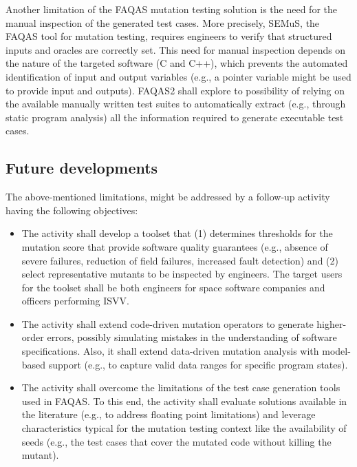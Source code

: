 Another limitation of the FAQAS mutation testing solution is the need for the manual inspection of the generated test cases. More precisely, SEMuS, the FAQAS tool for mutation testing, requires engineers to verify that structured inputs and oracles are correctly set. This need for manual inspection depends on the nature of the targeted software (C and C++), which prevents the automated identification of input and output variables (e.g., a pointer variable might be used to provide input and outputs). FAQAS2 shall explore to possibility of relying on the available manually written test suites to automatically extract (e.g., through static program analysis) all the information required to generate executable test cases.

\subsection{Future developments}

The above-mentioned limitations, might be addressed by a follow-up activity having the following objectives:

\begin{itemize}
\item {}
The activity shall develop a toolset that (1) determines thresholds for the mutation score that provide software quality guarantees (e.g., absence of severe failures, reduction of field failures, increased fault detection) and (2) select representative mutants to be inspected by engineers. The target users for the toolset shall be both engineers for space software companies and officers performing ISVV.

\item {} The activity shall extend code-driven mutation operators to generate higher-order errors, possibly simulating mistakes in the understanding of software specifications. Also, it shall extend data-driven mutation analysis with model-based support (e.g., to capture valid data ranges for specific program states).

\item {} The activity shall overcome the limitations of the test case generation tools used in FAQAS. To this end, the activity shall evaluate solutions available in the literature (e.g., to address floating point limitations) and leverage characteristics typical for the mutation testing context like the availability of seeds (e.g., the test cases that cover the mutated code without killing the mutant).

\end{itemize}

\ENDCHANGEDWPT
